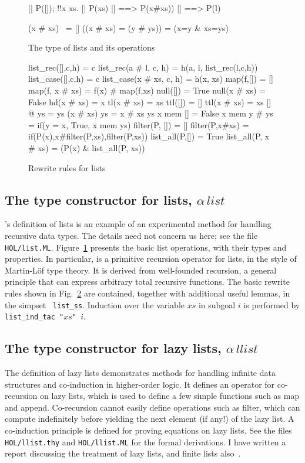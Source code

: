 \begin{figure}
\begin{ttbox}
    [| P([]);  !!x xs. [| P(xs) |] ==> P(x#xs)) |]  ==> P(l)

   (x # xs) ~= []
   ((x # xs) = (y # ys)) = (x=y & xs=ys)
\end{ttbox}
\caption{The type of lists and its operations} \label{hol-list}
\end{figure}

\begin{figure}
\begin{ttbox}\makeatother
list_rec([],c,h) = c  list_rec(a \# l, c, h) = h(a, l, list_rec(l,c,h))
list_case([],c,h) = c list_case(x # xs, c, h) = h(x, xs)
map(f,[]) = []        map(f, x \# xs) = f(x) \# map(f,xs)
null([]) = True       null(x # xs) = False
hd(x # xs) = x        tl(x # xs) = xs
ttl([]) = []          ttl(x # xs) = xs
[] @ ys = ys          (x # xs) \at ys = x # xs \at ys
x mem [] = False      x mem y # ys = if(y = x, True, x mem ys)
filter(P, []) = []    filter(P,x#xs) = if(P(x),x#filter(P,xs),filter(P,xs))
list_all(P,[]) = True list_all(P, x # xs) = (P(x) & list_all(P, xs))
\end{ttbox}
\caption{Rewrite rules for lists} \label{hol-list-simps}
\end{figure}

\subsection{The type constructor for lists, $\alpha\,list$}
\HOL's definition of lists is an example of an experimental method for
handling recursive data types.  The details need not concern us here; see the
file {\tt HOL/list.ML}.  Figure~\ref{hol-list} presents the basic list
operations, with their types and properties.  In particular,
 is a primitive recursion operator for lists, in the
style of Martin-L\"of type theory.  It is derived from well-founded
recursion, a general principle that can express arbitrary total recursive
functions. The basic rewrite rules shown in Fig.~\ref{hol-list-simps} are
contained, together with additional useful lemmas, in the simpset {\tt
  list_ss}. Induction over the variable $xs$ in subgoal $i$ is performed by
{\tt list_ind_tac "$xs$" $i$}.


\subsection{The type constructor for lazy lists, $\alpha\,llist$}
The definition of lazy lists demonstrates methods for handling infinite
data structures and co-induction in higher-order logic.  It defines an
operator for co-recursion on lazy lists, which is used to define a few
simple functions such as map and append.  Co-recursion cannot easily define
operations such as filter, which can compute indefinitely before yielding
the next element (if any!) of the lazy list.  A co-induction principle is
defined for proving equations on lazy lists.  See the files
{\tt HOL/llist.thy} and {\tt HOL/llist.ML} for the formal
derivations.  I have written a report discussing the treatment of lazy
lists, and finite lists also~\cite{paulson-coind}.


